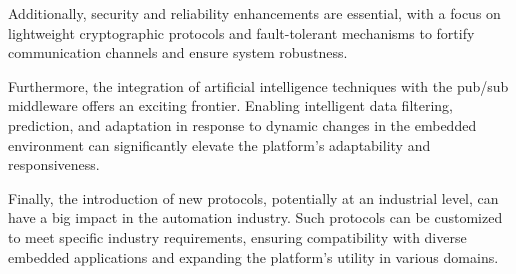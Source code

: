 Additionally, security and reliability enhancements are essential, with a focus on lightweight cryptographic protocols and fault-tolerant mechanisms to fortify communication channels and ensure system robustness.

Furthermore, the integration of artificial intelligence techniques with the pub/sub middleware offers an exciting frontier. Enabling intelligent data filtering, prediction, and adaptation in response to dynamic changes in the embedded environment can significantly elevate the platform's adaptability and responsiveness. 

Finally, the introduction of new protocols, potentially at an industrial level, can have a big impact in the automation industry. Such protocols can be customized to meet specific industry requirements, ensuring compatibility with diverse embedded applications and expanding the platform's utility in various domains.

